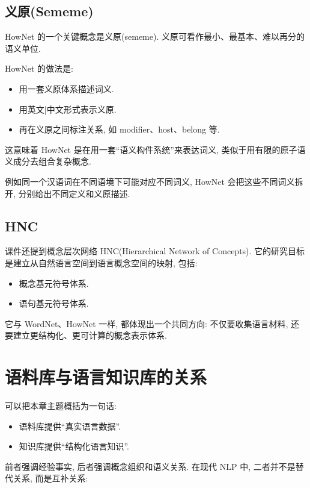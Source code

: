 \subsection{义原(Sememe)}


HowNet 的一个关键概念是义原(sememe).
义原可看作最小、最基本、难以再分的语义单位.

HowNet 的做法是:

\begin{itemize}
\item 用一套义原体系描述词义.
\item 用英文|中文形式表示义原.
\item 再在义原之间标注关系, 如 modifier、host、belong 等.
\end{itemize}

这意味着 HowNet 是在用一套“语义构件系统”来表达词义,
类似于用有限的原子语义成分去组合复杂概念.

例如同一个汉语词在不同语境下可能对应不同词义,
HowNet 会把这些不同词义拆开, 分别给出不同定义和义原描述.

\subsection{HNC}


课件还提到概念层次网络 HNC(Hierarchical Network of Concepts).
它的研究目标是建立从自然语言空间到语言概念空间的映射, 包括:

\begin{itemize}
\item 概念基元符号体系.
\item 语句基元符号体系.
\end{itemize}

它与 WordNet、HowNet 一样, 都体现出一个共同方向:
不仅要收集语言材料, 还要建立更结构化、更可计算的概念表示体系.

\section{语料库与语言知识库的关系}


可以把本章主题概括为一句话:

\begin{itemize}
\item 语料库提供“真实语言数据”.
\item 知识库提供“结构化语言知识”.
\end{itemize}

前者强调经验事实, 后者强调概念组织和语义关系.
在现代 NLP 中, 二者并不是替代关系, 而是互补关系:

